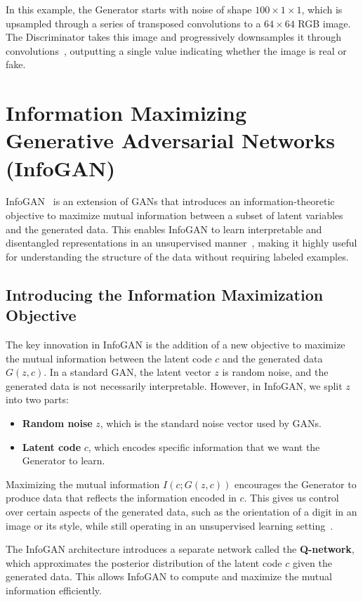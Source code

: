 In this example, the Generator starts with noise of shape \(100 \times 1 \times 1\), which is upsampled through a series of transposed convolutions to a \(64 \times 64\) RGB image. The Discriminator takes this image and progressively downsamples it through convolutions~\cite{lecun2015deep}, outputting a single value indicating whether the image is real or fake.

\section{Information Maximizing Generative Adversarial Networks (InfoGAN)}
InfoGAN~\cite{chen2016infogan} is an extension of GANs that introduces an information-theoretic objective to maximize mutual information between a subset of latent variables and the generated data. This enables InfoGAN to learn interpretable and disentangled representations in an unsupervised manner~\cite{kurutach2018learning}, making it highly useful for understanding the structure of the data without requiring labeled examples.

\subsection{Introducing the Information Maximization Objective}
The key innovation in InfoGAN is the addition of a new objective to maximize the mutual information between the latent code \(c\) and the generated data \(G(z, c)\). In a standard GAN, the latent vector \(z\) is random noise, and the generated data is not necessarily interpretable. However, in InfoGAN, we split \(z\) into two parts:

\begin{itemize}
    \item \textbf{Random noise} \(z\), which is the standard noise vector used by GANs.
    \item \textbf{Latent code} \(c\), which encodes specific information that we want the Generator to learn.
\end{itemize}

Maximizing the mutual information \(I(c; G(z, c))\) encourages the Generator to produce data that reflects the information encoded in \(c\). This gives us control over certain aspects of the generated data, such as the orientation of a digit in an image or its style, while still operating in an unsupervised learning setting~\cite{chen2016infogan}.

The InfoGAN architecture introduces a separate network called the \textbf{Q-network}, which approximates the posterior distribution of the latent code \(c\) given the generated data. This allows InfoGAN to compute and maximize the mutual information efficiently.

